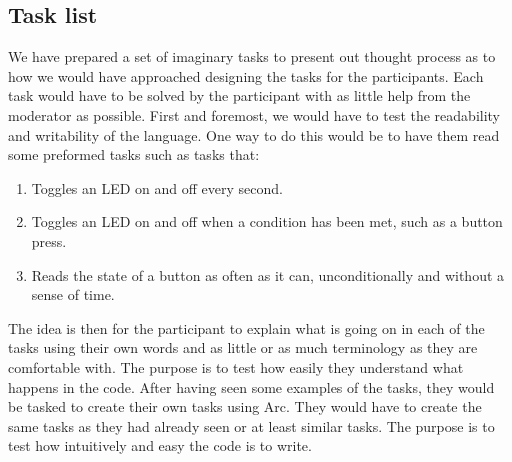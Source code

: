 
\subsection{Task list}\label{subsubsec:taskList}

We have prepared a set of imaginary tasks to present out thought process as to how we would have approached designing the tasks for the participants. Each task would have to be solved by the participant with as little help from the moderator as possible. First and foremost, we would have to test the readability and writability of the language. One way to do this would be to have them read some preformed tasks such as tasks that:

\begin{enumerate}
    \item Toggles an LED on and off every second.
    \item Toggles an LED on and off when a condition has been met, such as a button press.
    \item Reads the state of a button as often as it can, unconditionally and without a sense of time.
\end{enumerate}

The idea is then for the participant to explain what is going on in each of the tasks using their own words and as little or as much terminology as they are comfortable with. The purpose is to test how easily they understand what happens in the code. After having seen some examples of the tasks, they would be tasked to create their own tasks using Arc. They would have to create the same tasks as they had already seen or at least similar tasks. The purpose is to test how intuitively and easy the code is to write.


